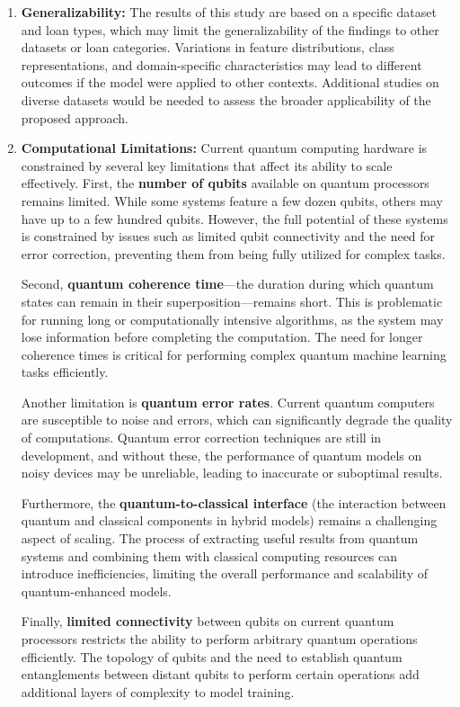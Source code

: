 \documentclass[a4paper]{article}
\begin{document}
\begin{enumerate}
	
	\item[] \textbf{Generalizability:} The results of this study are based on a specific dataset and loan types, which may limit the generalizability of the findings to other datasets or loan categories. Variations in feature distributions, class representations, and domain-specific characteristics may lead to different outcomes if the model were applied to other contexts. Additional studies on diverse datasets would be needed to assess the broader applicability of the proposed approach.
	
	\item[] \textbf{Computational Limitations:} Current quantum computing hardware is constrained by several key limitations that affect its ability to scale effectively. First, the \textbf{number of qubits} available on quantum processors remains limited. While some systems feature a few dozen qubits, others may have up to a few hundred qubits. However, the full potential of these systems is constrained by issues such as limited qubit connectivity and the need for error correction, preventing them from being fully utilized for complex tasks.
	
	Second, \textbf{quantum coherence time}—the duration during which quantum states can remain in their superposition—remains short. This is problematic for running long or computationally intensive algorithms, as the system may lose information before completing the computation. The need for longer coherence times is critical for performing complex quantum machine learning tasks efficiently.
	
	Another limitation is \textbf{quantum error rates}. Current quantum computers are susceptible to noise and errors, which can significantly degrade the quality of computations. Quantum error correction techniques are still in development, and without these, the performance of quantum models on noisy devices may be unreliable, leading to inaccurate or suboptimal results.
	
	Furthermore, the \textbf{quantum-to-classical interface} (the interaction between quantum and classical components in hybrid models) remains a challenging aspect of scaling. The process of extracting useful results from quantum systems and combining them with classical computing resources can introduce inefficiencies, limiting the overall performance and scalability of quantum-enhanced models.
	
	Finally, \textbf{limited connectivity} between qubits on current quantum processors restricts the ability to perform arbitrary quantum operations efficiently. The topology of qubits and the need to establish quantum entanglements between distant qubits to perform certain operations add additional layers of complexity to model training.
	

\end{enumerate}
\end{document}
